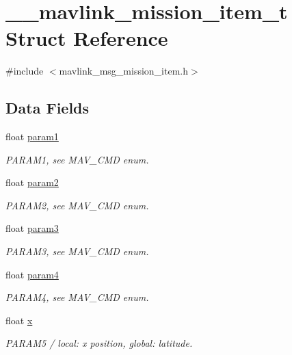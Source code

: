 \hypertarget{struct____mavlink__mission__item__t}{\section{\+\_\+\+\_\+mavlink\+\_\+mission\+\_\+item\+\_\+t Struct Reference}
\label{struct____mavlink__mission__item__t}
}


{\ttfamily \#include $<$mavlink\+\_\+msg\+\_\+mission\+\_\+item.\+h$>$}

\subsection*{Data Fields}
\begin{DoxyCompactItemize}
\item 
float \hyperlink{struct____mavlink__mission__item__t_a7b622b789be829088a8c9353946a4f28}{param1}
\begin{DoxyCompactList}\small\item\em P\+A\+R\+A\+M1, see M\+A\+V\+\_\+\+C\+M\+D enum. \end{DoxyCompactList}\item 
float \hyperlink{struct____mavlink__mission__item__t_ad523243067b6c47919554e8802f14b5c}{param2}
\begin{DoxyCompactList}\small\item\em P\+A\+R\+A\+M2, see M\+A\+V\+\_\+\+C\+M\+D enum. \end{DoxyCompactList}\item 
float \hyperlink{struct____mavlink__mission__item__t_a183425d5376a9173373279cc43ffce25}{param3}
\begin{DoxyCompactList}\small\item\em P\+A\+R\+A\+M3, see M\+A\+V\+\_\+\+C\+M\+D enum. \end{DoxyCompactList}\item 
float \hyperlink{struct____mavlink__mission__item__t_a8db8965269e5523972f4645f9b52d86d}{param4}
\begin{DoxyCompactList}\small\item\em P\+A\+R\+A\+M4, see M\+A\+V\+\_\+\+C\+M\+D enum. \end{DoxyCompactList}\item 
float \hyperlink{struct____mavlink__mission__item__t_a578c43dbf85decd47437180c89407f93}{x}
\begin{DoxyCompactList}\small\item\em P\+A\+R\+A\+M5 / local\+: x position, global\+: latitude. \end{DoxyCompactList}\item 

\end{DoxyCompactItemize}
